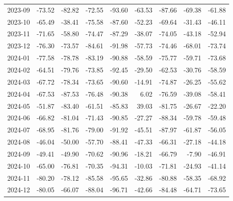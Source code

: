 \begin{table}[ht]
\begin{tabular}{lrrrrrrrr}
  2023-09 & -73.52 & -82.82 & -72.55 & -93.60 & -63.53 & -87.66 & -69.38 & -61.88 \\ 
  2023-10 & -65.49 & -38.41 & -75.58 & -87.60 & -52.23 & -69.64 & -31.43 & -46.11 \\ 
  2023-11 & -71.65 & -58.80 & -74.47 & -87.29 & -38.07 & -74.05 & -43.18 & -52.94 \\ 
  2023-12 & -76.30 & -73.57 & -84.61 & -91.98 & -57.73 & -74.46 & -68.01 & -73.74 \\ 
  2024-01 & -77.58 & -78.78 & -83.19 & -90.88 & -58.59 & -75.77 & -59.71 & -73.68 \\ 
  2024-02 & -64.51 & -79.76 & -73.85 & -92.45 & -29.50 & -62.53 & -30.76 & -58.59 \\ 
  2024-03 & -67.72 & -78.34 & -73.65 & -90.60 & -14.91 & -74.87 & -26.25 & -55.62 \\ 
  2024-04 & -67.53 & -87.53 & -76.48 & -90.38 & 6.02 & -76.59 & -39.08 & -58.41 \\ 
  2024-05 & -51.87 & -83.40 & -61.51 & -85.83 & 39.03 & -81.75 & -26.67 & -22.20 \\ 
  2024-06 & -66.82 & -81.04 & -71.43 & -90.85 & -27.27 & -88.34 & -59.78 & -59.48 \\ 
  2024-07 & -68.95 & -81.76 & -79.00 & -91.92 & -45.51 & -87.97 & -61.87 & -56.05 \\ 
  2024-08 & -46.04 & -50.00 & -57.70 & -88.41 & -47.33 & -66.31 & -27.18 & -44.18 \\ 
  2024-09 & -49.41 & -49.90 & -70.62 & -90.96 & -18.21 & -66.79 & -7.90 & -46.91 \\ 
  2024-10 & -65.00 & -76.81 & -70.35 & -94.31 & -10.03 & -71.81 & -24.93 & -41.14 \\ 
  2024-11 & -80.20 & -78.12 & -85.58 & -95.65 & -32.86 & -80.88 & -58.35 & -68.92 \\ 
  2024-12 & -80.05 & -66.07 & -88.04 & -96.71 & -42.66 & -84.48 & -64.71 & -73.65 \\ 
   \hline
\end{tabular}
\end{table}
